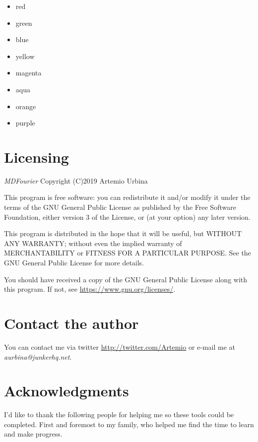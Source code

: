 \documentclass[10pt,a4paper]{report}
\begin{document}
\begin{appendices}
\begin{itemize}
	\item red
	\item green
	\item blue
	\item yellow
	\item magenta
	\item aqua
	\item orange
	\item purple
\end{itemize}

\chapter{Licensing}
\label{license}

\textit{MDFourier} Copyright (C)2019 Artemio Urbina

This program is free software: you can redistribute it and/or modify
it under the terms of the GNU General Public License as published by
the Free Software Foundation, either version 3 of the License, or
(at your option) any later version.

This program is distributed in the hope that it will be useful,
but WITHOUT ANY WARRANTY; without even the implied warranty of
MERCHANTABILITY or FITNESS FOR A PARTICULAR PURPOSE.  See the
GNU General Public License for more details.

You should have received a copy of the GNU General Public License
along with this program.  If not, see \url{https://www.gnu.org/licenses/}.	

\chapter{Contact the author}
\label{contact}

You can contact me via twitter \url{http://twitter.com/Artemio} or e-mail me at \textit{aurbina@junkerhq.net}.

\chapter{Acknowledgments}

I'd like to thank the following people for helping me so these tools could be completed. First and foremost to my family, who helped me find the time to learn and make progress.

\end{appendices}
\end{document}

